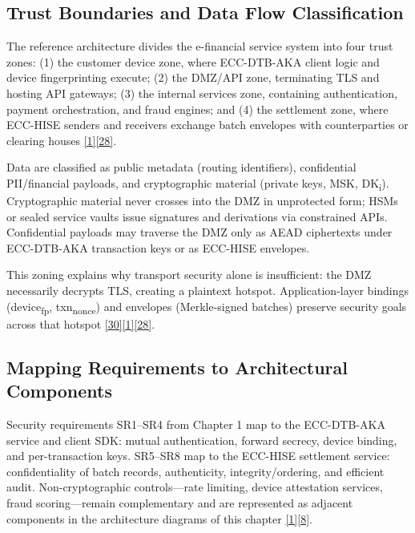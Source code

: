 \subsection{Trust Boundaries and Data Flow Classification}

\indent The reference architecture divides the e-financial service system into four trust zones: (1) the customer device zone, where ECC-DTB-AKA client logic and device fingerprinting execute; (2) the DMZ/API zone, terminating TLS and hosting API gateways; (3) the internal services zone, containing authentication, payment orchestration, and fraud engines; and (4) the settlement zone, where ECC-HISE senders and receivers exchange batch envelopes with counterparties or clearing houses \hyperref[ref:1]{[1]}\hyperref[ref:28]{[28]}.

\indent Data are classified as public metadata (routing identifiers), confidential PII/financial payloads, and cryptographic material (private keys, MSK, DK\textsubscript{i}). Cryptographic material never crosses into the DMZ in unprotected form; HSMs or sealed service vaults issue signatures and derivations via constrained APIs. Confidential payloads may traverse the DMZ only as AEAD ciphertexts under ECC-DTB-AKA transaction keys or as ECC-HISE envelopes.

\indent This zoning explains why transport security alone is insufficient: the DMZ necessarily decrypts TLS, creating a plaintext hotspot. Application-layer bindings (device\textsubscript{fp}, txn\textsubscript{nonce}) and envelopes (Merkle-signed batches) preserve security goals across that hotspot \hyperref[ref:30]{[30]}\hyperref[ref:1]{[1]}\hyperref[ref:28]{[28]}.

\subsection{Mapping Requirements to Architectural Components}

\indent Security requirements SR1--SR4 from Chapter 1 map to the ECC-DTB-AKA service and client SDK: mutual authentication, forward secrecy, device binding, and per-transaction keys. SR5--SR8 map to the ECC-HISE settlement service: confidentiality of batch records, authenticity, integrity/ordering, and efficient audit. Non-cryptographic controls---rate limiting, device attestation services, fraud scoring---remain complementary and are represented as adjacent components in the architecture diagrams of this chapter \hyperref[ref:1]{[1]}\hyperref[ref:8]{[8]}.

